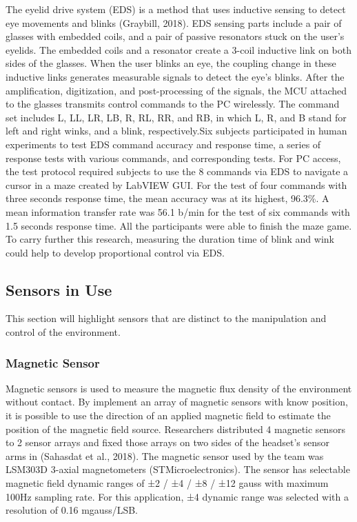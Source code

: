 The eyelid drive system (EDS) is a method that uses inductive sensing to detect eye movements and blinks (Graybill, 2018). EDS sensing parts include a pair of glasses with embedded coils, and a pair of passive resonators stuck on the user's eyelids. The embedded coils and a resonator create a 3-coil inductive link on both sides of the glasses. When the user blinks an eye, the coupling change in these inductive links generates measurable signals to detect the eye's blinks. After the amplification, digitization, and post-processing of the signals, the MCU attached to the glasses transmits control commands to the PC wirelessly. The command set includes L, LL, LR, LB, R, RL, RR, and RB, in which L, R, and B stand for left and right winks, and a blink, respectively.Six subjects participated in human experiments to test EDS command accuracy and response time,  a series of response tests with various commands, and corresponding tests. For PC access, the test protocol required subjects to use the 8 commands via EDS to navigate a cursor in a maze created by LabVIEW GUI. For the test of four commands with three seconds response time, the mean accuracy was at its highest, 96.3\%. A mean information transfer rate was 56.1 b/min for the test of six commands with 1.5 seconds response time. All the participants were able to finish the maze game. To carry further this research, measuring the duration time of blink and wink could help to develop proportional control via EDS.



\subsection{Sensors in Use}
This section will highlight sensors that are distinct to the manipulation and control of the environment.

\subsubsection{Magnetic Sensor}
Magnetic sensors is used to measure the magnetic flux density of the environment without contact. By implement an array of magnetic sensors with know position, it is possible to use the direction of an applied magnetic field to estimate the position of the magnetic field source. Researchers distributed 4 magnetic sensors to 2 sensor arrays and fixed those arrays on two sides of the headset's sensor arms in (Sahasdat et al., 2018). The magnetic sensor used by the team was LSM303D 3-axial magnetometers (STMicroelectronics). The sensor has selectable magnetic field dynamic ranges of ±2 / ±4 / ±8 / ±12 gauss with maximum 100Hz sampling rate. For this application, ±4 dynamic range was selected with a resolution of 0.16 mgauss/LSB.

